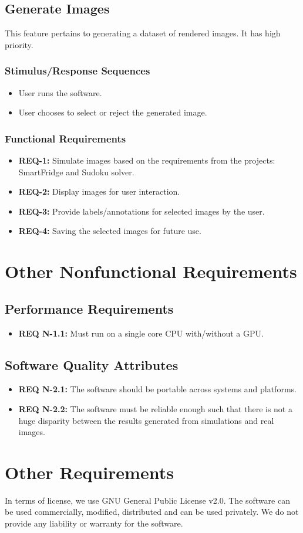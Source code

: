 \documentclass[a4paper,12pt]{article}
\begin{document}
\subsection{Generate Images}
This feature pertains to generating a dataset of rendered images. It has high priority.


\subsubsection{Stimulus/Response Sequences}
\begin{itemize}
\item User runs the software.
\item User chooses to select or reject the generated image.
\end{itemize}
\subsubsection{Functional Requirements}
\begin{itemize}
\item \textbf{REQ-1:} Simulate images based on the requirements from the projects: SmartFridge and Sudoku solver.
\item \textbf{REQ-2:} Display images for user interaction.
\item \textbf{REQ-3:} Provide labels/annotations for selected images by the user.
\item \textbf{REQ-4:} Saving the selected images for future use.
\end{itemize}
\section{Other Nonfunctional Requirements}
\subsection{Performance Requirements}
\begin{itemize}
\item \textbf{REQ N-1.1:} Must run on a single core CPU with/without a GPU.
\end{itemize}

\subsection{Software Quality Attributes}
\begin{itemize}
\item \textbf{REQ N-2.1:} The software should be portable across systems and platforms.
\item \textbf{REQ N-2.2:} The software must be reliable enough such that there is not a huge disparity between the results generated from simulations and real images.
\end{itemize}

\section{Other Requirements}
In terms of license, we use GNU General Public License v2.0. The software can be used commercially, modified, distributed and can be used privately. We do not provide any liability or warranty for the software.
\end{document}
